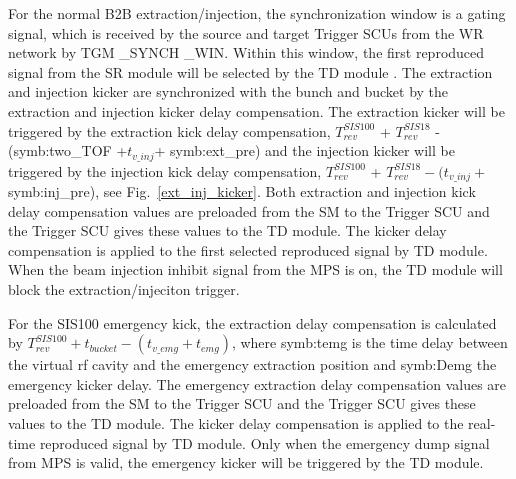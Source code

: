For the normal B2B extraction/injection, the synchronization window is a gating signal, which is received by the source and target Trigger SCUs from the WR network by TGM \_SYNCH \_WIN. Within this window, the first reproduced signal from the SR module will be selected by the \gls{TD} module . The extraction and injection kicker are synchronized with the bunch and bucket by the extraction and injection kicker delay compensation. The extraction kicker will be triggered by the extraction kick delay compensation, $T_{\mathit{rev}}^{\mathit{SIS100}}$ + $T_{\mathit{rev}}^{\mathit{SIS18}}$ -(\gls{symb:two_TOF} +$ t_{v\_inj}$+ \gls{symb:ext_pre}) and the injection kicker will be triggered by the injection kick delay compensation, $T_{\mathit{rev}}^{\mathit{SIS100}}$ + $T_{\mathit{rev}}^{\mathit{SIS18}} - (t_{v\_inj}+$ \gls{symb:inj_pre}), see Fig.~\ref{ext_inj_kicker}. Both extraction and injection kick delay compensation values are preloaded from the SM to the Trigger SCU and the Trigger SCU gives these values to the TD module. The kicker delay compensation is applied to the first selected reproduced signal by TD module. When the beam injection inhibit signal from the MPS is on, the TD module will block the extraction/injeciton trigger.

For the SIS100 emergency kick, the extraction delay compensation is calculated by $T_{\mathit{rev}}^{\mathit{SIS100}} + t_{bucket} - (t_{v\_emg} + t_{emg})$, where \gls{symb:temg} is the time delay between the virtual rf cavity and the emergency extraction position and \gls{symb:Demg} the emergency kicker delay. The emergency extraction delay compensation values are preloaded from the SM to the Trigger SCU and the Trigger SCU gives these values to the TD module. The kicker delay compensation is applied to the real-time reproduced signal by TD module. Only when the emergency dump signal from MPS is valid, the emergency kicker will be triggered by the TD module.


